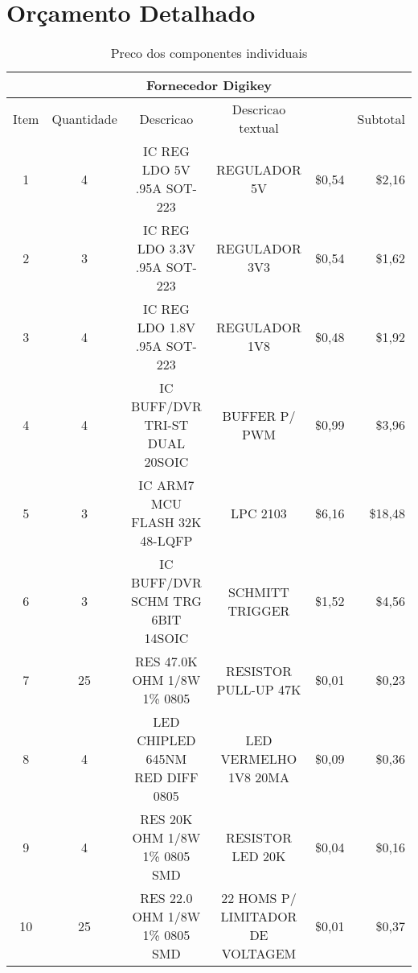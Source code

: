 \chapter{Or\c{c}amento Detalhado}

\begin{table}[!h]\tiny
  \centering
  \caption{Preco dos componentes individuais}
    \begin{tabular}{rrrrrr}
    \toprule
    \multicolumn{6}{c}{\textbf{Fornecedor Digikey}} \\
    \midrule
    \multicolumn{1}{c}{Item} & \multicolumn{1}{c}{Quantidade} & \multicolumn{1}{c}{Descricao} & \multicolumn{1}{c}{Descricao textual} &       & Subtotal \\
    \multicolumn{1}{c}{1} & \multicolumn{1}{c}{4} & \multicolumn{1}{c}{IC REG LDO 5V .95A SOT-223} & \multicolumn{1}{c}{REGULADOR 5V} & \$0,54 & \$2,16 \\
    \multicolumn{1}{c}{2} & \multicolumn{1}{c}{3} & \multicolumn{1}{c}{IC REG LDO 3.3V .95A SOT-223} & \multicolumn{1}{c}{REGULADOR 3V3} & \$0,54 & \$1,62 \\
    \multicolumn{1}{c}{3} & \multicolumn{1}{c}{4} & \multicolumn{1}{c}{IC REG LDO 1.8V .95A SOT-223} & \multicolumn{1}{c}{REGULADOR 1V8} & \$0,48 & \$1,92 \\
    \multicolumn{1}{c}{4} & \multicolumn{1}{c}{4} & \multicolumn{1}{c}{IC BUFF/DVR TRI-ST DUAL 20SOIC} & \multicolumn{1}{c}{BUFFER P/ PWM} & \$0,99 & \$3,96 \\
    \multicolumn{1}{c}{5} & \multicolumn{1}{c}{3} & \multicolumn{1}{c}{IC ARM7 MCU FLASH 32K 48-LQFP} & \multicolumn{1}{c}{LPC 2103} & \$6,16 & \$18,48 \\
    \multicolumn{1}{c}{6} & \multicolumn{1}{c}{3} & \multicolumn{1}{c}{IC BUFF/DVR SCHM TRG 6BIT 14SOIC} & \multicolumn{1}{c}{SCHMITT TRIGGER} & \$1,52 & \$4,56 \\
    \multicolumn{1}{c}{7} & \multicolumn{1}{c}{25} & \multicolumn{1}{c}{RES 47.0K OHM 1/8W 1\% 0805} & \multicolumn{1}{c}{RESISTOR PULL-UP 47K} & \$0,01 & \$0,23 \\
    \multicolumn{1}{c}{8} & \multicolumn{1}{c}{4} & \multicolumn{1}{c}{LED CHIPLED 645NM RED DIFF 0805} & \multicolumn{1}{c}{LED VERMELHO 1V8 20MA} & \$0,09 & \$0,36 \\
    \multicolumn{1}{c}{9} & \multicolumn{1}{c}{4} & \multicolumn{1}{c}{RES 20K OHM 1/8W 1\% 0805 SMD} & \multicolumn{1}{c}{RESISTOR LED 20K} & \$0,04 & \$0,16 \\
    \multicolumn{1}{c}{10} & \multicolumn{1}{c}{25} & \multicolumn{1}{c}{RES 22.0 OHM 1/8W 1\% 0805 SMD} & \multicolumn{1}{c}{22 HOMS P/ LIMITADOR DE VOLTAGEM} & \$0,01 & \$0,37 \\

\end{tabular}
\end{table}
